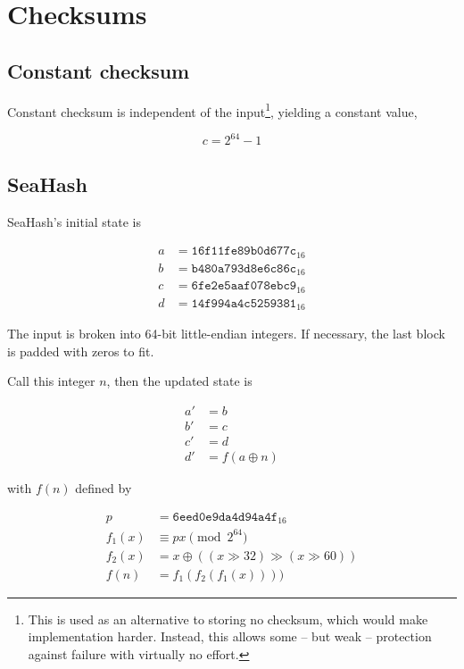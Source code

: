 \documentclass[11pt,a4paper]{report}
\begin{document}
    \section{Checksums}
        \subsection{Constant checksum}
        \label{checksum:constant}
        Constant checksum is independent of the input\footnote{This is used as
        an alternative to storing no checksum, which would make implementation
        harder. Instead, this allows some -- but weak -- protection against failure
        with virtually no effort.}, yielding a constant value,

        $$c = 2^{64} - 1$$

        \subsection{SeaHash}
        \label{checksum:seahash}
        SeaHash's initial state is

        \begin{align*}
            a &= \texttt{16f11fe89b0d677c}_{16} \\
            b &= \texttt{b480a793d8e6c86c}_{16} \\
            c &= \texttt{6fe2e5aaf078ebc9}_{16} \\
            d &= \texttt{14f994a4c5259381}_{16}
        \end{align*}

        The input is broken into 64-bit little-endian integers. If necessary,
        the last block is padded with zeros to fit.

        Call this integer $n$, then the updated state is

        \begin{align*}
            a' &= b \\
            b' &= c \\
            c' &= d \\
            d' &= f(a \oplus n)
        \end{align*}

        with $f(n)$ defined by

        \begin{align*}
            p      &=      \texttt{6eed0e9da4d94a4f}_{16} \\
            f_1(x) &\equiv px \pmod{2^{64}} \\
            f_2(x) &=      x \oplus ((x \gg 32) \gg (x \gg 60)) \\
            f(n)   &=      f_1(f_2(f_1(x))))
        \end{align*}
\end{document}

